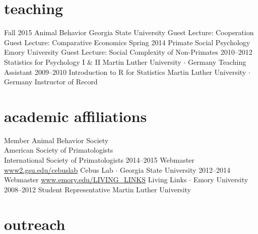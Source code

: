 \documentclass[]{friggeri-cv}
\begin{document}
\newpage
\thispagestyle{fancy}

\section{teaching}

\begin{entrylist}
  \entry
    {Fall 2015}
    {Animal Behavior}
    {Georgia State University}
    {Guest Lecture: Cooperation\\
    Guest Lecture: Comparative Economics}
  \entry
    {Spring 2014}
    {Primate Social Psychology}
    {Emory University}
    {Guest Lecture: Social Complexity of Non-Primates}
  \entry
    {2010--2012}
    {Statistics for Psychology I \& II}
    {Martin Luther University $\cdot$ Germany}
    {Teaching Assistant}
  \entry
    {2009--2010}
    {Introduction to R for Statistics}
    {Martin Luther University $\cdot$ Germany}
    {Instructor of Record}
\end{entrylist}


\section{academic affiliations}

\begin{entrylist}
  \entry
    {}
    {Member}
    {}
    {Animal Behavior Society\\
    American Society of Primatologists\\
    International Society of Primatologists}
  \entry
    {2014--2015}
    {Webmaster}
    {\href{http://www2.gsu.edu/cebuslab}{www2.gsu.edu/cebuslab}}
    {Cebus Lab $\cdot$ Georgia State University}
  \entry
    {2012--2014}
    {Webmaster}
    {\href{http://www.emory.edu/LIVING_LINKS}{www.emory.edu/LIVING\_LINKS}}
    {Living Links $\cdot$ Emory University}
  \entry
    {2008--2012}
    {Student Representative}
    {}
    {Martin Luther University}
\end{entrylist}

\section{outreach}
\end{document}

